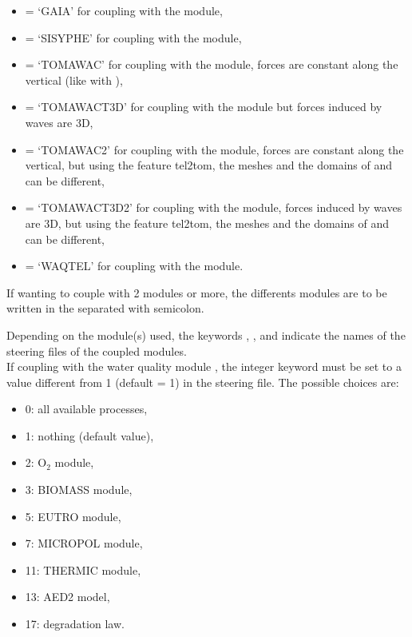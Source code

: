 \begin{itemize}
\item {} = `GAIA' for coupling with the \gaia module,

\item {} = `SISYPHE' for coupling with the \sisyphe module,

\item {} = `TOMAWAC' for coupling with the \tomawac module,
forces are constant along the vertical (like with ),

\item {} = `TOMAWACT3D' for coupling with the \tomawac
module but forces induced by waves are 3D,

\item {} = `TOMAWAC2' for coupling with the \tomawac
module, forces are constant along the vertical, but using the feature tel2tom,
the meshes and the domains of  and \tomawac can be different,

\item {} = `TOMAWACT3D2' for coupling with the \tomawac
module, forces induced by waves are 3D, but using the feature tel2tom,
the meshes and the domains of  and \tomawac can be different,

\item {} = `WAQTEL' for coupling with the \waqtel module.

\end{itemize}

If wanting to couple with 2 modules or more, the differents modules are to
be written in the  separated with semicolon.

Depending on the module(s) used, the keywords
, ,
 and 
indicate the names of the steering files
of the coupled modules.\\

If coupling with the water quality module \waqtel, the integer keyword
 must be set to a value different from 1
(default = 1) in the  steering file.
The possible choices are:
\begin{itemize}
\item 0: all available processes,
\item 1: nothing (default value),
\item 2: O$_2$ module,
\item 3: BIOMASS module,
\item 5: EUTRO module,
\item 7: MICROPOL module,
\item 11: THERMIC module,
\item 13: AED2 model,
\item 17: degradation law.
\end{itemize}


